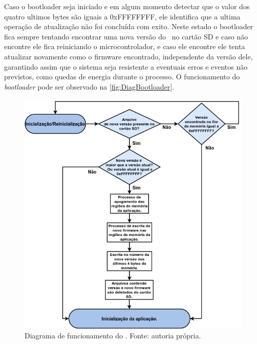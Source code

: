 Caso o bootloader seja iniciado e em algum momento detectar que o valor dos quatro ultimos bytes são iguais a 0xFFFFFFFF, ele identifica que a ultima operação de atualização não foi concluída com exito. Neste estado o bootloader fica sempre tentando encontrar uma nova versão do \firmware\ no cartão SD e caso não encontre ele fica reiniciando o microcontrolador, e caso ele encontre ele tenta atualizar novamente como o firmware encontrado, independente da versão dele, garantindo assim que o sistema seja resistente a eventuais erros e eventos não previstos, como quedas de energia durante o processo. O funcionamento do \textit{bootloader} pode ser observado na \autoref{fig:DiagBootloader}.

\begin{figure}[H]
    \scriptsize
     \centering
     \includegraphics[scale=0.6]{dados/figuras/FuncionamentoBootloader.png}
     \caption{Diagrama de funcionamento do \bootloader. \newline Fonte: autoria própria.}
     \label{fig:DiagBootloader}
\end{figure}


